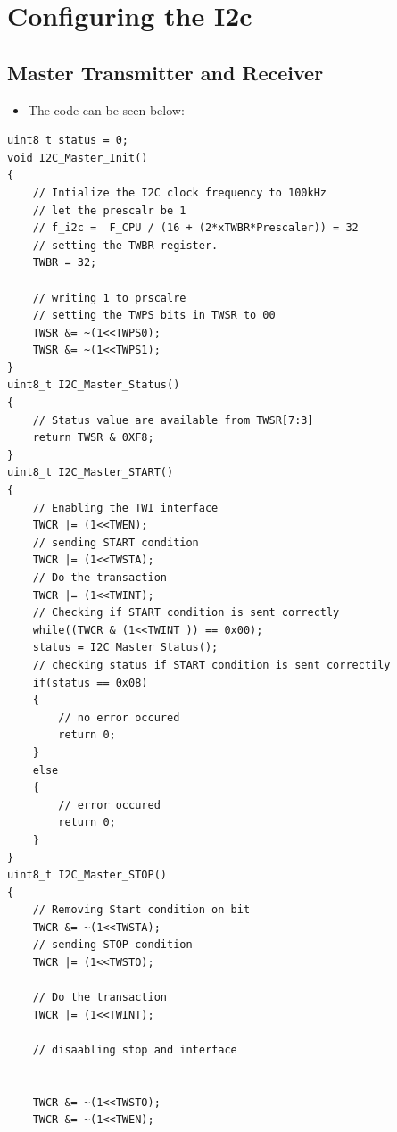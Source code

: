 \documentclass{article}
\begin{document}
\section{Configuring the I2c}
\subsection{Master Transmitter and Receiver}
\begin{itemize}
    \item The code can be seen below:
\end{itemize}
\begin{verbatim}
uint8_t status = 0;
void I2C_Master_Init()
{
	// Intialize the I2C clock frequency to 100kHz
	// let the prescalr be 1
	// f_i2c =  F_CPU / (16 + (2*xTWBR*Prescaler)) = 32
	// setting the TWBR register.
	TWBR = 32;

	// writing 1 to prscalre
	// setting the TWPS bits in TWSR to 00
	TWSR &= ~(1<<TWPS0);
	TWSR &= ~(1<<TWPS1);
}
uint8_t I2C_Master_Status()
{
	// Status value are available from TWSR[7:3]
	return TWSR & 0XF8;
}
uint8_t I2C_Master_START()
{
	// Enabling the TWI interface
	TWCR |= (1<<TWEN);
	// sending START condition
	TWCR |= (1<<TWSTA);
	// Do the transaction
	TWCR |= (1<<TWINT);
	// Checking if START condition is sent correctly
	while((TWCR & (1<<TWINT )) == 0x00);
	status = I2C_Master_Status();
	// checking status if START condition is sent correctily
	if(status == 0x08)
	{
		// no error occured
		return 0;
	}
	else
	{
		// error occured
		return 0;
	}
}
uint8_t I2C_Master_STOP()
{
	// Removing Start condition on bit
	TWCR &= ~(1<<TWSTA);
	// sending STOP condition
	TWCR |= (1<<TWSTO);
	
	// Do the transaction
	TWCR |= (1<<TWINT);

	// disaabling stop and interface
	
	
	TWCR &= ~(1<<TWSTO);
	TWCR &= ~(1<<TWEN);


\end{verbatim}
\end{document}
